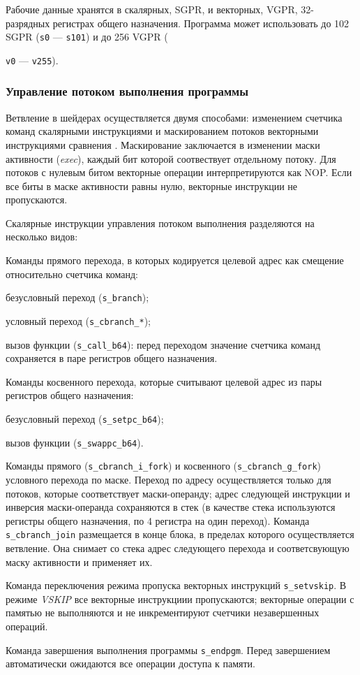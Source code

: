 \documentclass[a4paper,14pt]{extarticle}
\begin{document}
Рабочие данные хранятся в скалярных, SGPR, и векторных, VGPR,
32-разрядных регистрах общего назначения. Программа может использовать до 102
SGPR (\verb|s0| — \verb|s101|) и до 256 VGPR ({\verb|v0| — \verb|v255|).

\subsubsection{Управление потоком выполнения программы}
\label{section:gcn-program-flow}

Ветвление в шейдерах осуществляется двумя способами: изменением счетчика команд скалярными
инструкциями и маскированием потоков векторными инструкциями сравнения \cite{vega-isa}.
Маскирование заключается в изменении маски активности (\textit{exec}), каждый бит которой
соотвествует отдельному потоку. Для потоков с нулевым битом векторные операции интерпретируются как NOP.
Если все биты в маске активности равны нулю, векторные инструкции не пропускаются.

Скалярные инструкции управления потоком выполнения разделяются на несколько видов:
\begin{ol}
\item Команды прямого перехода, в которых кодируется целевой адрес как смещение относительно счетчика команд:
  \begin{ul}
  \item безусловный переход (\verb|s_branch|);
  \item условный переход (\verb|s_cbranch_*|);
  \item вызов функции (\verb|s_call_b64|): перед переходом значение счетчика команд
  сохраняется в паре регистров общего назначения.
  \end{ul}
\item Команды косвенного перехода, которые считывают целевой адрес из пары регистров общего назначения:
  \begin{ul}
  \item безусловный переход (\verb|s_setpc_b64|);
  \item вызов функции (\verb|s_swappc_b64|).
  \end{ul}
\item Команды прямого (\verb|s_cbranch_i_fork|) и косвенного (\verb|s_cbranch_g_fork|)
  условного перехода по маске. Переход по адресу осуществляется только для потоков, которые соответствует
  маски-операнду; адрес следующей инструкции и инверсия маски-операнда сохраняются в стек
  (в качестве стека используются регистры общего назначения, по 4 регистра на один переход).
  Команда \verb|s_cbranch_join| размещается в конце блока, в пределах которого осуществляется ветвление.
  Она снимает со стека адрес следующего перехода и соответсвующую маску активности и применяет их.
\item Команда переключения режима пропуска векторных инструкций \verb|s_setvskip|. В режиме
  \textit{VSKIP} все векторные инструкциии пропускаются; векторные операции с памятью не выполняются
  и не инкрементируют счетчики незавершенных операций.
\item Команда завершения выполнения программы \verb|s_endpgm|. Перед завершением автоматически
  ожидаются все операции доступа к памяти.
\end{ol}

}
\end{document}
